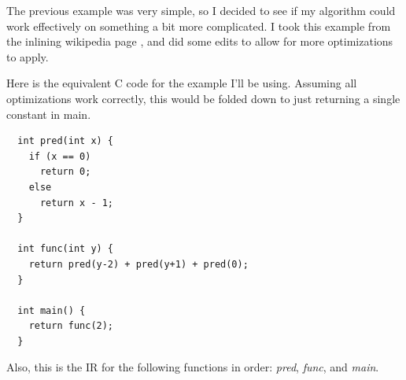 \documentclass[11pt, a4paper, titlepage]{article}
\begin{document}
The previous example was very simple, so I decided to see if my algorithm could work effectively on something a bit more complicated.
I took this example from the inlining wikipedia page \cite{inlinewiki}, and did some edits to allow for more optimizations to apply. 

Here is the equivalent C code for the example I'll be using. Assuming all optimizations work correctly, this would be folded down to just returning a single constant in main.

\begin{lstlisting}
  int pred(int x) {
    if (x == 0)
      return 0;
    else
      return x - 1;
  }

  int func(int y) {
    return pred(y-2) + pred(y+1) + pred(0);
  }

  int main() {
    return func(2);
  }
\end{lstlisting}

Also, this is the IR for the following functions in order: \textit{pred}, \textit{func}, and \textit{main}.
\end{document}
